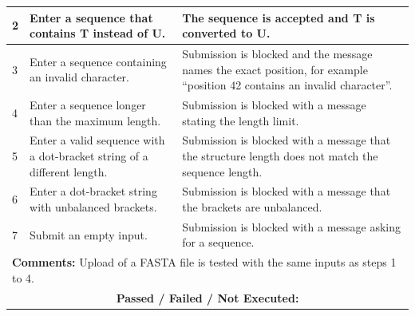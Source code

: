 \documentclass{FastFyp}
\begin{document}
{\begin{longtable}{|p{2.4cm}|p{4.6cm}|p{2.4cm}|p{3.8cm}|}
2 & Enter a sequence that contains T instead of U. & \multicolumn{2}{p{6.64cm}|}{The sequence is accepted and T is converted to U.} \\ \hline
3 & Enter a sequence containing an invalid character. & \multicolumn{2}{p{6.64cm}|}{Submission is blocked and the message names the exact position, for example ``position 42 contains an invalid character''.} \\ \hline
4 & Enter a sequence longer than the maximum length. & \multicolumn{2}{p{6.64cm}|}{Submission is blocked with a message stating the length limit.} \\ \hline
5 & Enter a valid sequence with a dot-bracket string of a different length. & \multicolumn{2}{p{6.64cm}|}{Submission is blocked with a message that the structure length does not match the sequence length.} \\ \hline
6 & Enter a dot-bracket string with unbalanced brackets. & \multicolumn{2}{p{6.64cm}|}{Submission is blocked with a message that the brackets are unbalanced.} \\ \hline
7 & Submit an empty input. & \multicolumn{2}{p{6.64cm}|}{Submission is blocked with a message asking for a sequence.} \\ \hline
\multicolumn{4}{|p{14.51cm}|}{\textbf{Comments:} Upload of a FASTA file is tested with the same inputs as steps 1 to 4.} \\ \hline
\multicolumn{4}{|c|}{\textbf{Passed / Failed / Not Executed:}} \\ \hline
\end{longtable}
}
\end{document}
